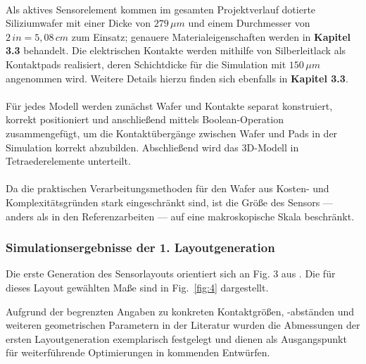 \documentclass[12pt, a4paper]{article}
\begin{document}
\paragraph{}

Als aktives Sensorelement kommen im gesamten Projektverlauf dotierte Siliziumwafer mit einer Dicke von $279\,\mu{m}$ und einem Durchmesser von $2\,in=5,08\,cm$ zum Einsatz; genauere Materialeigenschaften werden in \textbf{Kapitel 3.3} behandelt.\newline
Die elektrischen Kontakte werden mithilfe von Silberleitlack als Kontaktpads realisiert, deren Schichtdicke für die Simulation mit $150\,\mu{m}$ angenommen wird. Weitere Details hierzu finden sich ebenfalls in \textbf{Kapitel 3.3}.\paragraph{}

Für jedes Modell werden zunächst Wafer und Kontakte separat konstruiert, korrekt positioniert und anschließend mittels Boolean-Operation zusammengefügt, um die Kontaktübergänge zwischen Wafer und Pads in der Simulation korrekt abzubilden. Abschließend wird das 3D-Modell in Tetraederelemente unterteilt.\paragraph{}

Da die praktischen Verarbeitungsmethoden für den Wafer aus Kosten- und Komplexitätsgründen stark eingeschränkt sind, ist die Größe des Sensors --- anders als in den Referenzarbeiten --- auf eine makroskopische Skala beschränkt.

\subsubsection{Simulationsergebnisse der 1. Layoutgeneration}
Die erste Generation des Sensorlayouts orientiert sich an Fig. 3 aus \cite{cres23}. Die für dieses Layout gewählten Maße sind in Fig.~\ref{fig:4} dargestellt.\newline

Aufgrund der begrenzten Angaben zu konkreten Kontaktgrößen, -abständen und weiteren geometrischen Parametern in der Literatur wurden die Abmessungen der ersten Layoutgeneration exemplarisch festgelegt und dienen als Ausgangspunkt für weiterführende Optimierungen in kommenden Entwürfen.\paragraph{} %
\end{document}
